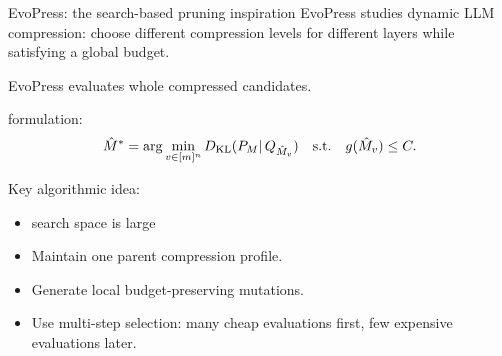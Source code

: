 \documentclass[aspectratio=169,11pt]{beamer}
\newcommand{\KL}{D_{\mathrm{KL}}}
\begin{document}
\begin{frame}{EvoPress: the search-based pruning inspiration}
EvoPress studies dynamic LLM compression: choose different compression levels for different layers while satisfying a global budget.

EvoPress evaluates whole compressed candidates.

\vspace{0.2cm}
formulation:
\[
\hat M^* = \arg\min_{v\in[m]^n} \KL(P_M\,\\|\,Q_{\hat M_v})
\quad\text{s.t.}\quad g(\hat M_v)\le C.
\]

\vspace{0.2cm}
Key algorithmic idea:
\begin{itemize}
   \item search space is large
  \item Maintain one parent compression profile.
  \item Generate local budget-preserving mutations.
  \item Use multi-step selection: many cheap evaluations first, few expensive evaluations later.
\end{itemize}
\end{frame}


\end{document}
